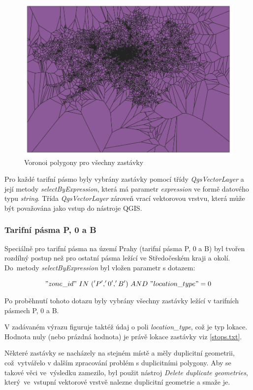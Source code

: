 \begin{figure}[H] \centering
    \includegraphics[width=400pt]{./pictures/voronoi-stops.png}
    \caption[Voronoi polygony pro všechny zastávky]{Voronoi polygony pro všechny zastávky}
	\label{fig:voronoi-stops}              
\end{figure}
  
Pro každé tarifní pásmo byly vybrány zastávky pomocí třídy \textit{QgsVectorLayer}
a její metody \textit{selectByExpression}, která má parametr \textit{expression} ve formě datového
typu \textit{string}. 
Třída \textit{QgsVectorLayer} zároveň vrací vektorovou vrstvu, která může být považována jako vstup do nástroje QGIS.

\subsubsection{Tarifní pásma P, 0 a B}

Speciálně pro tarifní pásma na území Prahy (tarifní pásma P, 0 a B) byl tvořen rozdílný postup
než pro ostatní pásma ležící ve Středočeském kraji a okolí. Do~meto\-dy \textit{selectByExpression} byl vložen
parametr s dotazem: 

\["zone\_id"\ IN\ ('P','0','B')\ AND\ "location\_type" = 0\]

Po proběhnutí tohoto dotazu byly vybrány všechny zastávky ležící v tarifních pásmech P, 0 a B. 

V zadávaném výrazu figuruje taktéž údaj o poli \textit{location\_type}, což je typ lokace. 
Hodnota nuly (nebo prázdná hodnota) je právě lokace zastávky viz \ref{stops.txt}.

Některé zastávky se nacházely na stejném místě a měly duplicitní geometrii, což~vytvářelo v dalším
zpracování problém s duplicitními polygony. Aby se takové věci ve~výsledku zamezilo, byl použit nástroj   
\textit{Delete duplicate geometries}, který~ve~vstupní vektorové vrstvě nalezne duplicitní geometrie a smaže je.

